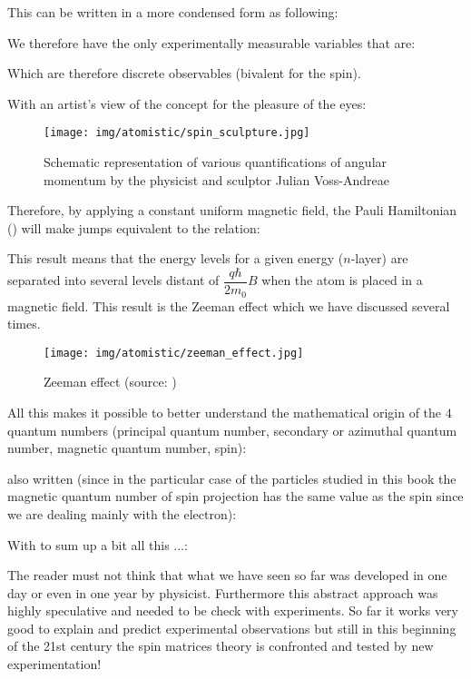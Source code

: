 	This can be written in a more condensed form as following:
	
	We therefore have the only experimentally measurable variables that are:
	
	Which are therefore discrete observables (bivalent for the spin).

	With an artist's view of the concept for the pleasure of the eyes:
	\begin{figure}[H]
		\centering
		\texttt{[image: img/atomistic/spin\_sculpture.jpg]}	
		\caption{Schematic representation of various quantifications of angular momentum by the physicist and sculptor Julian Voss-Andreae}
	\end{figure}
	Therefore, by applying a constant uniform magnetic field, the Pauli Hamiltonian () will make jumps equivalent to the relation:
	
	This result means that the energy levels for a given energy ($n$-layer) are separated into several levels distant of $\dfrac{q\hbar}{2m_0}B$ when the atom is placed in a magnetic field. This result is the Zeeman effect which we have discussed several times.
	\begin{figure}[H]
		\centering
		\texttt{[image: img/atomistic/zeeman\_effect.jpg]}	
		\caption[Zeeman effect]{Zeeman effect (source: \cite{serway2018physics})}
	\end{figure}
	All this makes it possible to better understand the mathematical origin of the $4$ quantum numbers (principal quantum number, secondary or azimuthal quantum number, magnetic quantum number, spin):
	
	also written (since in the particular case of the particles studied in this book the magnetic quantum number of spin projection has the same value as the spin since we are dealing mainly with the electron):
	
	With to sum up a bit all this ...:
	
	The reader must not think that what we have seen so far was developed in one day or even in one year by physicist. Furthermore this abstract approach was highly speculative and needed to be check with experiments. So far it works very good to explain and predict experimental observations but still in this beginning of the 21st century the spin matrices theory is confronted and tested by new experimentation!
	
	\pagebreak
